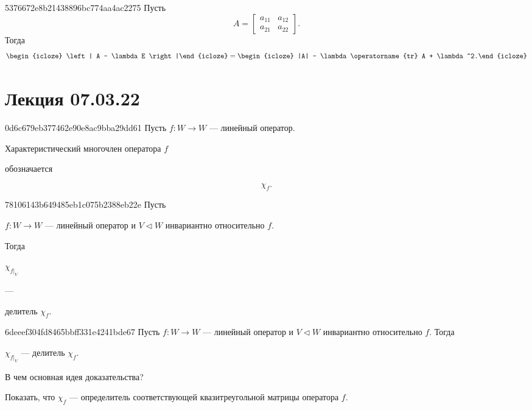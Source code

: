 \begin{note}{5376672e8b21438896bc774aa4ac2275}
    Пусть
    \[
        A = \begin{bmatrix}
            a_{11} & a_{12} \\
            a_{21} & a_{22}
        \end{bmatrix}.
    \]
    Тогда
    \[
        \begin{icloze}{2}\left| A - \lambda E \right|\end{icloze}
        = \begin{icloze}{1}|A| - \lambda \operatorname{tr} A + \lambda^2.\end{icloze}
\]
\end{note}

\section{Лекция 07.03.22}
\begin{note}{0d6c679eb377462e90e8ac9bba29dd61}
    Пусть \( f : W \to W \) --- линейный оператор.
    \begin{icloze}{2}Характеристический многочлен оператора \( f \)\end{icloze} обозначается \begin{icloze}{1}
    \[
        \chi_f.
    \]
\end{icloze}
\end{note}

\begin{note}{78106143b649485eb1c075b2388eb22e}
    Пусть \begin{icloze}{3}\( f : W \to W \) --- линейный оператор и \( V \triangleleft W \) инвариантно относительно \( f \).\end{icloze}
    Тогда
    \begin{center}
        \begin{icloze}{2}\( \chi_{f|_V} \)\end{icloze} --- \begin{icloze}{1}делитель \( \chi_f \).\end{icloze}
    \end{center}
\end{note}

\begin{note}{6deeef304fd8465bbff331e4241bde67}
    Пусть \( f : W \to W \) --- линейный оператор и \( V \triangleleft W \) инвариантно относительно \( f \).
    Тогда
    \begin{center}
        \( \chi_{f|_V} \) --- делитель \( \chi_f \).
    \end{center}

    В чем основная идея доказательства?

    \begin{cloze}{1}
        Показать, что \( \chi_f \) --- определитель соответствующей квазитреугольной матрицы оператора \( f \).
    \end{cloze}
\end{note}

